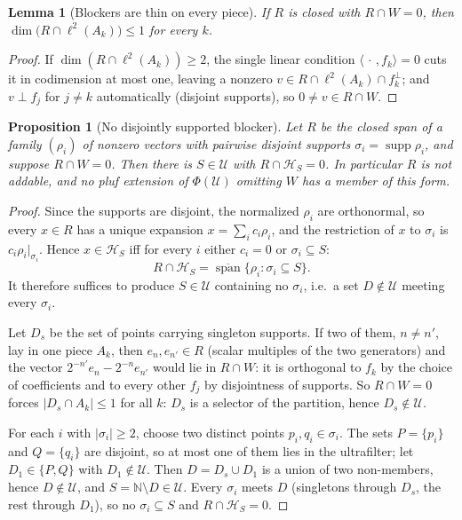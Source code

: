 \documentclass[11pt,reqno]{amsart}
\newtheorem{proposition}[theorem]{Proposition}
\newtheorem{lemma}[theorem]{Lemma}
\theoremstyle{definition}
\newcommand{\HH}{\mathcal{H}}
\newcommand{\N}{\mathbb{N}}
\newcommand{\U}{\mathcal{U}}
\newcommand{\supp}{\operatorname{supp}}
\begin{document}
\begin{lemma}[Blockers are thin on every piece]\label{lem:thin}
If $R$ is closed with $R\cap W=0$, then $\dim\bigl(R\cap\ell^2(A_k)\bigr)\le1$ for
every $k$.
\end{lemma}

\begin{proof}
If $\dim(R\cap\ell^2(A_k))\ge2$, the single linear condition
$\langle\,\cdot\,,f_k\rangle=0$ cuts it in codimension at most one, leaving a nonzero
$v\in R\cap\ell^2(A_k)\cap f_k^\perp$; and $v\perp f_j$ for $j\neq k$ automatically
(disjoint supports), so $0\neq v\in R\cap W$.
\end{proof}

\begin{proposition}[No disjointly supported blocker]\label{prop:noblock}
Let $R$ be the closed span of a family $(\rho_i)$ of nonzero vectors with pairwise
disjoint supports $\sigma_i=\supp\rho_i$, and suppose $R\cap W=0$. Then there is
$S\in\U$ with $R\cap\HH_S=0$. In particular $R$ is not addable, and no pluf extension
of $\Phi(\U)$ omitting $W$ has a member of this form.
\end{proposition}

\begin{proof}
Since the supports are disjoint, the normalized $\rho_i$ are orthonormal, so every
$x\in R$ has a unique expansion $x=\sum_ic_i\rho_i$, and the restriction of $x$ to
$\sigma_i$ is $c_i\rho_i|_{\sigma_i}$. Hence $x\in\HH_S$ iff for every $i$ either
$c_i=0$ or $\sigma_i\subseteq S$:
\[
R\cap\HH_S=\overline{\operatorname{span}}\{\rho_i:\sigma_i\subseteq S\}.
\]
It therefore suffices to produce $S\in\U$ containing no $\sigma_i$, i.e.\ a set
$D\notin\U$ meeting every $\sigma_i$.

Let $D_s$ be the set of points carrying singleton supports. If two of them, $n\neq
n'$, lay in one piece $A_k$, then $e_n,e_{n'}\in R$ (scalar multiples of the two
generators) and the vector $2^{-n'}e_n-2^{-n}e_{n'}$ would lie in $R\cap W$: it is
orthogonal to $f_k$ by the choice of coefficients and to every other $f_j$ by
disjointness of supports. So $R\cap W=0$ forces $|D_s\cap A_k|\le1$ for all $k$:
$D_s$ is a selector of the partition, hence $D_s\notin\U$.

For each $i$ with $|\sigma_i|\ge2$, choose two distinct points
$p_i,q_i\in\sigma_i$. The sets $P=\{p_i\}$ and $Q=\{q_i\}$ are disjoint, so at most
one of them lies in the ultrafilter; let $D_1\in\{P,Q\}$ with $D_1\notin\U$. Then
$D=D_s\cup D_1$ is a union of two non-members, hence $D\notin\U$, and
$S=\N\setminus D\in\U$. Every $\sigma_i$ meets $D$ (singletons through $D_s$, the
rest through $D_1$), so no $\sigma_i\subseteq S$ and $R\cap\HH_S=0$.
\end{proof}
\end{document}
